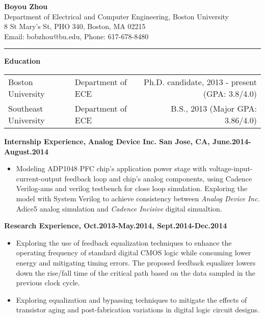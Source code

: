 \documentclass[]{article}
\begin{document}
\pagestyle{empty}
\begin{center}
\vspace{-0.2in}
{\large\textbf{Boyou Zhou}}\\
Department of Electrical and Computer Engineering, Boston University\\
8 St Mary's St, PHO 340, Boston, MA 02215\\
Email: bobzhou@bu.edu, Phone: 617-678-8480\\
\rule[-0.1cm]{7.5in}{0.01cm}
\end{center}
%

\textbf{Education}
\vspace{-0.1in}
\begin{table*}[h]
  \begin{tabular}{p{2.0in}p{2.0in}r}
    Boston University& Department of ECE & Ph.D. candidate, 2013 - present
    (GPA: 3.8/4.0)\\ 
    Southeast University & Department of ECE & B.S., 2013
    (Major GPA: 3.86/4.0)\\ 
  \end{tabular}
  \label{tbl:1}
\end{table*}

\vspace{-0.1in}
\noindent \textbf{Internship Experience,}
\textbf{Analog Device Inc. San Jose, CA, June.2014-August.2014}
    \begin{itemize}
        \item Modeling ADP1048 PFC chip's application power stage with
        voltage-input-current-output feedback loop and chip's analog components,
        using Cadence Verilog-ams and verilog testbench for close loop
        simulation. Exploring the model with System Verilog to achieve
        consistency between \textit{Analog Device Inc.} Adice5 analog simulation
        and \textit{Cadence Incisive} digital simualtion. 
    \end{itemize}

\noindent \textbf{Research Experience, Oct.2013-May.2014, Sept.2014-Dec.2014}
		\begin{itemize}
            \item Exploring the use of feedback equalization techniques to
            enhance the operating frequency of standard digital CMOS logic
            while consuming lower energy and mitigating timing errors. The
            proposed feedback equalizer lowers down the rise/fall time of
            the critical path based on the data sampled in the previous
            clock cycle. 

            \item Exploring equalization and bypassing techniques to mitigate
            the effects of transistor aging and post-fabrication
            variations in digital logic circuit designs.
		
        \end{itemize}
\end{document}
